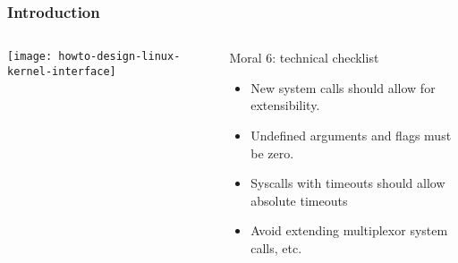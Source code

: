 \begin{frame}[plain]
	\frametitle{Introduction}
	
	
	
	\begin{columns}
		
		\begin{column}{.4\textwidth}
			
			\texttt{[image: howto-design-linux-kernel-interface]}
			
		\end{column}
		
		\begin{column}{.6\textwidth}
			\large
			\begin{block}{Moral 6: technical checklist	}
			\begin{itemize}
			\item New system calls should allow for extensibility. 

			\item Undefined arguments and flags must be zero. 
			\item Syscalls with timeouts should allow absolute timeouts 
			\item Avoid extending multiplexor system calls, etc.

		    \end{itemize}
			\end{block} 
			
			

		\end{column}
		
		
	\end{columns}
	
	
\end{frame}

